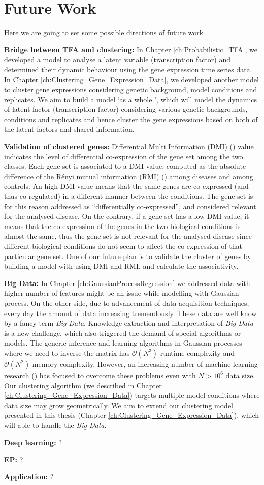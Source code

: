 \section{Future Work}
Here we are going to set some possible directions of future work

\textbf{Bridge between TFA and clustering:} In Chapter \ref{ch:Probabilistic_TFA}, we developed a model to analyse a latent variable (transcription factor) and determined their dynamic behaviour using the gene expression time series data. In Chapter  \ref{ch:Clustering_Gene_Expression_Data}, we developed another model to cluster  gene expressions considering genetic background, model conditions and replicates. We aim to build a model \lq as a whole \rq, which will model the dynamics of latent factor (transcription factor) considering various genetic backgrounds, conditions and replicates and hence cluster the gene expressions based on both of the latent factors and shared information.

\textbf{Validation of clustered genes:} Differential Multi Information (DMI) (\cite{Gambardella:2015}) value indicates the level of differential co-expression of the gene set among the two classes. Each gene set is associated to a DMI value, computed as the absolute difference of the R{\'e}nyi mutual information (RMI) (\cite{Renyi:1960}) among diseases and among controls. An high DMI value means that the same genes are co-expressed (and thus co-regulated) in a different manner between the conditions. The gene set is for this reason addressed as ``differentially co-expressed'', and considered relevant for the analysed disease. On the contrary, if a gene set has a low DMI value, it means that the co-expression of the genes in the two biological conditions is almost the same, thus the gene set is not relevant for the analysed disease since different biological conditions do not seem to affect the co-expression of that particular gene set. One of our future plan is to validate the cluster of genes by building a model with using DMI and RMI, and calculate the associativity.


\textbf{Big Data:} 
In Chapter \ref{ch:GaussianProcessRegression} we addressed data with higher number of features might be an issue while modelling with Gaussian process. On the other side, due to advancement of data acquisition techniques, every day the amount of data increasing tremendously. These data are well know by a fancy term \emph{Big Data}. Knowledge extraction and interpretation of \emph{Big Data} is a new challenge, which also triggered the demand of special algorithms or models. The generic inference and learning algorithms in Gaussian processes where we need to inverse the matrix has $\mathcal{O}\left(N^3\right)$ runtime complexity and $\mathcal{O}\left(N^2\right)$ memory complexity. However, an increasing number of machine learning research (\cite{Hensman:2013a, Dai:2014}) has focused to overcome these problems even with $N>10^6$ data size. Our clustering algorithm (we described in Chapter \ref{ch:Clustering_Gene_Expression_Data}) targets multiple model conditions where data size may grow geometrically. We aim to extend our clustering model presented in this thesis (Chapter \ref{ch:Clustering_Gene_Expression_Data}), which will able to handle the \emph{Big Data}.  


\textbf{Deep learning:} ?

\textbf{EP:} ?

\textbf{Application:} ?


